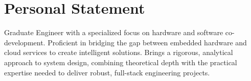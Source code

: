 \section{Personal Statement}
\vspace{2pt}
Graduate Engineer with a specialized focus on hardware and software co-development. Proficient in bridging the gap between embedded hardware and cloud services to create intelligent solutions. Brings a rigorous, analytical approach to system design, combining theoretical depth with the practical expertise needed to deliver robust, full-stack engineering projects.
